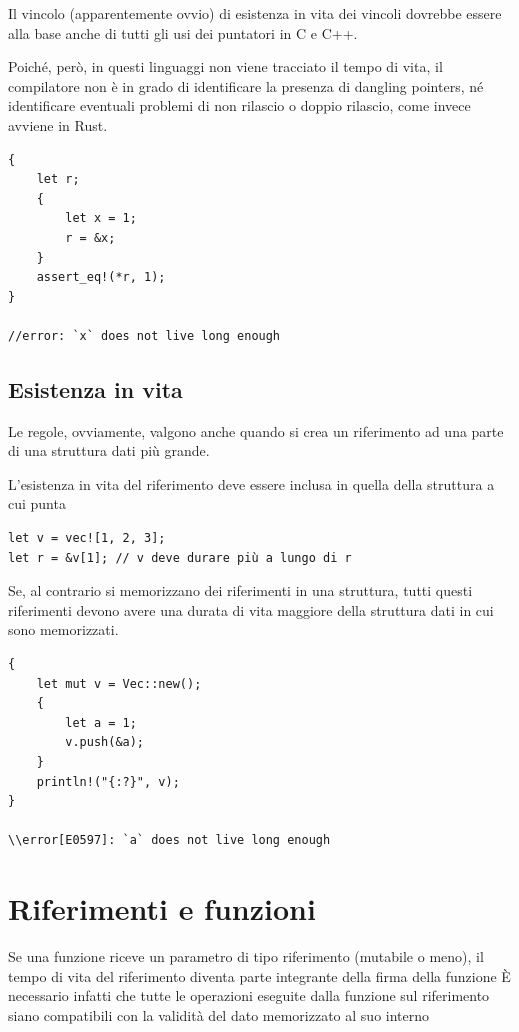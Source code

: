 Il vincolo (apparentemente ovvio) di esistenza in vita dei vincoli dovrebbe essere alla
base anche di tutti gli usi dei puntatori in C e C++.

Poiché, però, in questi linguaggi non viene tracciato il tempo di vita, il compilatore non è in grado di identificare la presenza di dangling pointers, né identificare eventuali problemi di non rilascio o doppio rilascio, come invece avviene in Rust.

\begin{verbatim}
{
    let r;
    {
        let x = 1;
        r = &x;
    }
    assert_eq!(*r, 1);
}

//error: `x` does not live long enough
\end{verbatim}


\subsection{Esistenza in vita}

Le regole, ovviamente, valgono anche quando si crea un riferimento ad una parte di una struttura dati più grande.

L'esistenza in vita del riferimento deve essere inclusa in quella della struttura a cui punta

\begin{verbatim}
let v = vec![1, 2, 3];
let r = &v[1]; // v deve durare più a lungo di r
\end{verbatim}

Se, al contrario si memorizzano dei riferimenti in una struttura, tutti questi riferimenti
devono avere una durata di vita maggiore della struttura dati in cui sono memorizzati.



\begin{verbatim}
{
    let mut v = Vec::new();
    {
        let a = 1;
        v.push(&a);
    }
    println!("{:?}", v);
}

\\error[E0597]: `a` does not live long enough
\end{verbatim}

\section{Riferimenti e funzioni}

Se una funzione riceve un parametro di tipo riferimento (mutabile o meno), il tempo
di vita del riferimento diventa parte integrante della firma della funzione
È necessario infatti che tutte le operazioni eseguite dalla funzione sul riferimento siano compatibili con la validità del dato memorizzato al suo interno

